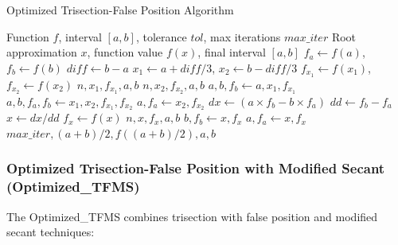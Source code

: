 \documentclass[11pt,a4paper]{article}
\begin{document}
\begin{algorithm}[H]
\caption{Optimized Trisection-False Position Algorithm}
\begin{algorithmic}[1]
\REQUIRE Function $f$, interval $[a,b]$, tolerance $tol$, max iterations $max\_iter$
\ENSURE Root approximation $x$, function value $f(x)$, final interval $[a,b]$
\STATE $f_a \leftarrow f(a)$, $f_b \leftarrow f(b)$
    \STATE $diff \leftarrow b - a$
    \STATE $x_1 \leftarrow a + diff/3$, $x_2 \leftarrow b - diff/3$
    \STATE $f_{x_1} \leftarrow f(x_1)$, $f_{x_2} \leftarrow f(x_2)$
        \RETURN $n, x_1, f_{x_1}, a, b$
    \ENDIF
        \RETURN $n, x_2, f_{x_2}, a, b$
    \ENDIF
        \STATE $a, b, f_b \leftarrow a, x_1, f_{x_1}$
        \STATE $a, b, f_a, f_b \leftarrow x_1, x_2, f_{x_1}, f_{x_2}$
    \ELSE
        \STATE $a, f_a \leftarrow x_2, f_{x_2}$
    \ENDIF
    \STATE $dx \leftarrow (a \times f_b - b \times f_a)$
    \STATE $dd \leftarrow f_b - f_a$
    \STATE $x \leftarrow dx / dd$
    \STATE $f_x \leftarrow f(x)$
        \RETURN $n, x, f_x, a, b$
    \ENDIF
        \STATE $b, f_b \leftarrow x, f_x$
    \ELSE
        \STATE $a, f_a \leftarrow x, f_x$
    \ENDIF
\ENDFOR
\RETURN $max\_iter, (a + b)/2, f((a + b)/2), a, b$
\end{algorithmic}
\end{algorithm}

\subsubsection{Optimized Trisection-False Position with Modified Secant (Optimized\_TFMS)}

The Optimized\_TFMS combines trisection with false position and modified secant techniques:
\end{document}
